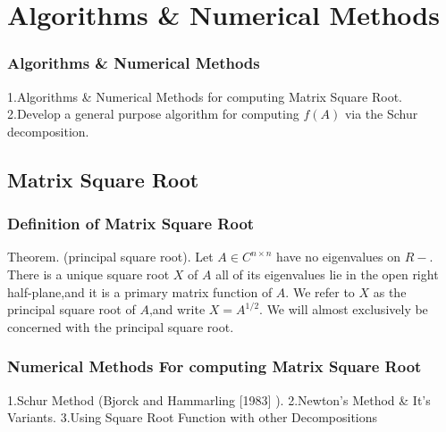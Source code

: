 

\section{Algorithms \& Numerical Methods}


\begin{frame}

\frametitle{Algorithms \& Numerical Methods}
1.Algorithms \& Numerical Methods for computing Matrix Square Root.
\newline
\newline
2.Develop a general purpose algorithm for computing $f(A)$
via the Schur decomposition.

\end{frame}

\subsection{Matrix Square Root}
\begin{frame}

\frametitle{Definition of Matrix Square Root}
Theorem. (principal square root). Let $A \in C^{n \times n}$ have no eigenvalues on $R{-}$.\newline
There is a unique square root $X$ of $A$ all of its eigenvalues lie in the open right
half-plane,\newline and it is a primary matrix function of $A$. We refer to $X$ as the principal
square root of $A$,\newline and write $X = A^{1/2}$.\newline
\newline
\newline
We will almost exclusively be concerned with the principal square root.
\end{frame}



\begin{frame}

\frametitle{Numerical Methods For computing Matrix Square Root}
1.Schur Method (Bjorck and Hammarling [1983] ).\newline
2.Newton's Method \& It's Variants.\newline
3.Using Square Root Function with other Decompositions

\end{frame}

